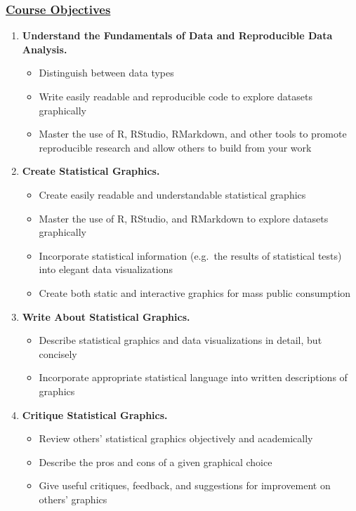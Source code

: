 \documentclass[11pt]{article}
\begin{document}
\vspace*{1mm}

\subsubsection*{\underline{Course Objectives}}
\begin{enumerate}
\item {\bf Understand the Fundamentals of Data and Reproducible Data Analysis.}
\begin{itemize}
	\item Distinguish between data types
	\item Write easily readable and reproducible code to explore datasets graphically
	\item Master the use of R, RStudio, RMarkdown, and other tools to promote reproducible research and allow others to build from your work
\end{itemize}

\item {\bf Create Statistical Graphics.}
\begin{itemize}
	\item Create easily readable and understandable statistical graphics
	\item Master the use of R, RStudio, and RMarkdown to explore datasets graphically
	\item Incorporate statistical information (e.g.\ the results of statistical tests) into elegant data visualizations
	\item Create both static and interactive graphics for mass public consumption
\end{itemize}

\item {\bf Write About Statistical Graphics.}
\begin{itemize}
	\item Describe statistical graphics and data visualizations in detail, but concisely
	\item Incorporate appropriate statistical language into written descriptions of graphics
\end{itemize}

\item {\bf Critique Statistical Graphics.}
\begin{itemize}
	\item Review others' statistical graphics objectively and academically
	\item Describe the pros and cons of a given graphical choice
	\item Give useful critiques, feedback, and suggestions for improvement on others' graphics
\end{itemize}

\end{enumerate}
\end{document}
